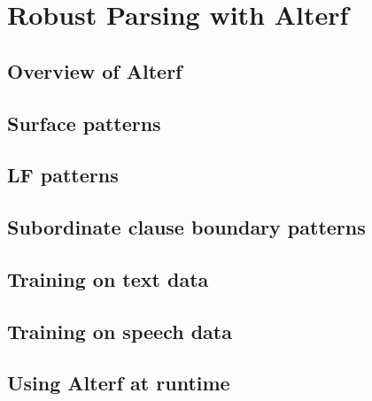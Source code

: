 \chapter{Robust Parsing with Alterf}
\label{Chapter:Alterf}

\author{Manny Rayner}

\section{Overview of Alterf}
\label{Section:AlterfOverview}

\section{Surface patterns}
\label{Section:SurfacePatterns}

\section{LF patterns}
\label{Section:LFPatterns}

\section{Subordinate clause boundary patterns}
\label{Section:BoundaryPatterns}

\section{Training on text data}
\label{Section:AlterfText}

\section{Training on speech data}
\label{Section:AlterfSpeech}

\section{Using Alterf at runtime}
\label{Section:AlterfRuntime}
